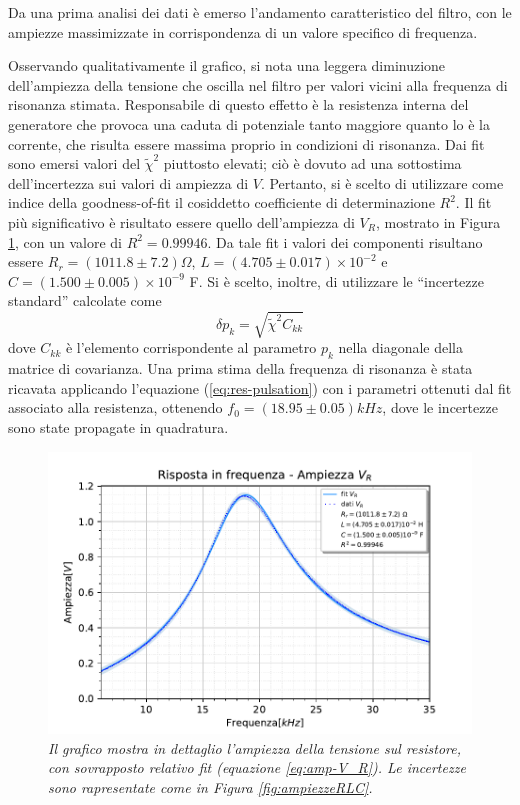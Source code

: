Da una prima analisi dei dati è emerso l'andamento caratteristico del filtro, con le ampiezze massimizzate
in corrispondenza di un valore specifico di frequenza.

Osservando qualitativamente il grafico, si nota una leggera diminuzione dell’ampiezza della tensione che oscilla nel filtro
per valori vicini alla frequenza di risonanza stimata. Responsabile di questo effetto è la resistenza interna del generatore
che provoca una caduta di potenziale tanto maggiore quanto lo è la corrente, che risulta essere massima proprio in
condizioni di risonanza.
 Dai fit sono emersi valori del $\tilde{\chi}^2$ piuttosto elevati; ciò è dovuto ad una sottostima dell'incertezza sui
valori di ampiezza di $V$. Pertanto, si è scelto di utilizzare come indice della goodness-of-fit
il cosiddetto coefficiente di determinazione $R^2$.
Il fit più significativo è risultato essere quello dell'ampiezza di $V_R$, mostrato in Figura \ref{fig:ampiezzeR}, con
un valore di $R^2 = 0.99946$. Da tale fit i valori dei componenti risultano essere $R_r = (1011.8 \pm 7.2) \Omega$,
$L = (4.705 \pm 0.017) \times 10^{-2}$ e $C = (1.500 \pm 0.005)\times 10^{-9}$ F. Si è scelto, inoltre, di utilizzare le
``incertezze standard'' calcolate come
\[
    \delta p_k = \sqrt{\tilde{\chi}^2 C_{kk}}
\]
dove $C_{kk}$ è l'elemento corrispondente al parametro $p_k$ nella diagonale della matrice di covarianza.
Una prima stima della frequenza di risonanza è stata ricavata applicando l'equazione (\ref{eq:res-pulsation}) con i
parametri ottenuti dal fit associato alla resistenza, ottenendo $f_0 = (18.95 \pm 0.05) kHz$, dove le incertezze sono
state propagate in quadratura.
\begin{figure}[h]
    \centering
    \includegraphics[width=.77\textwidth]{../figs/Risposta-in-frequenza-ampiezza-resistenza.pdf}
    \caption{\emph{Il grafico mostra in dettaglio l'ampiezza della tensione sul resistore, con sovrapposto relativo fit
        (equazione \ref{eq:amp-V_R}). Le incertezze sono rapresentate come in Figura \ref{fig:ampiezzeRLC}.}}\label{fig:ampiezzeR}
\end{figure}
